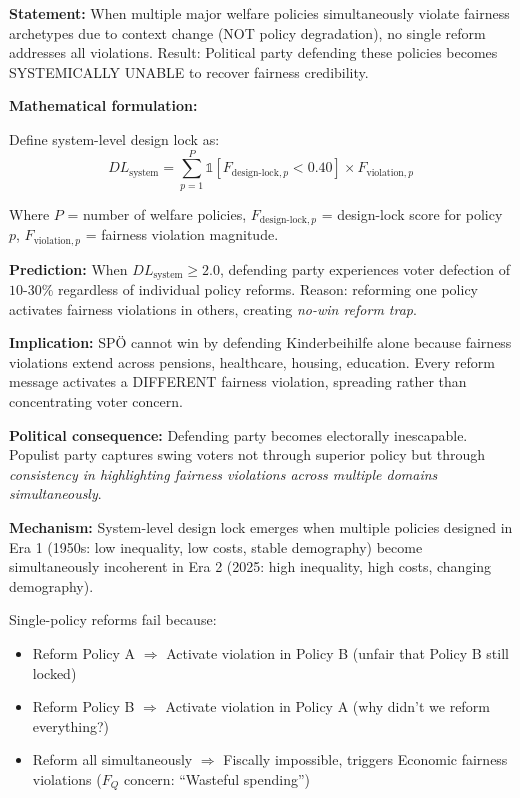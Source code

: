 \begin{tcolorbox}[colback=gray!5!white, colframe=gray!75!black,
    title=Axiom CM-11: System-Level Design Lock and Political Inescapability]

\textbf{Statement:} When multiple major welfare policies simultaneously violate fairness archetypes
due to context change (NOT policy degradation), no single reform addresses all violations. Result:
Political party defending these policies becomes SYSTEMICALLY UNABLE to recover fairness credibility.

\textbf{Mathematical formulation:}

Define system-level design lock as:
\begin{equation}
DL_{\text{system}} = \sum_{p=1}^{P} \mathbb{1}[F_{\text{design-lock},p} < 0.40] \times F_{\text{violation},p}
\end{equation}

Where $P$ = number of welfare policies, $F_{\text{design-lock},p}$ = design-lock score for policy $p$,
$F_{\text{violation},p}$ = fairness violation magnitude.

\textbf{Prediction:} When $DL_{\text{system}} \geq 2.0$, defending party experiences voter defection
of $10$-$30\%$ regardless of individual policy reforms. Reason: reforming one policy activates
fairness violations in others, creating \textit{no-win reform trap}.

\textbf{Implication:} SPÖ cannot win by defending Kinderbeihilfe alone because fairness violations
extend across pensions, healthcare, housing, education. Every reform message activates a DIFFERENT
fairness violation, spreading rather than concentrating voter concern.

\textbf{Political consequence:} Defending party becomes electorally inescapable. Populist party
captures swing voters not through superior policy but through \textit{consistency in highlighting
fairness violations across multiple domains simultaneously}.

\end{tcolorbox}

\vspace{0.5em}

\textbf{Mechanism:} System-level design lock emerges when multiple policies designed in Era 1
(1950s: low inequality, low costs, stable demography) become simultaneously incoherent in Era 2
(2025: high inequality, high costs, changing demography).

Single-policy reforms fail because:
\begin{itemize}[nosep]
\item Reform Policy A $\Rightarrow$ Activate violation in Policy B (unfair that Policy B still locked)
\item Reform Policy B $\Rightarrow$ Activate violation in Policy A (why didn't we reform everything?)
\item Reform all simultaneously $\Rightarrow$ Fiscally impossible, triggers Economic fairness violations ($F_Q$ concern: ``Wasteful spending'')
\end{itemize}

